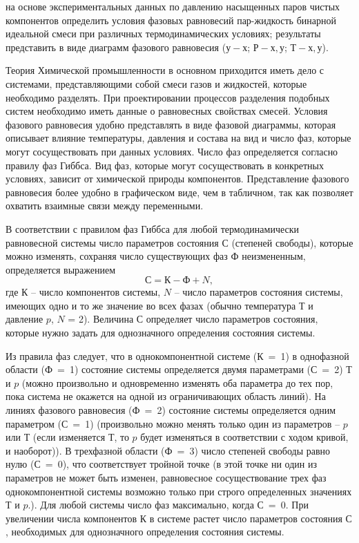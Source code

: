 
\goal на основе экспериментальных данных по давлению насыщенных паров чистых компонентов определить условия фазовых равновесий пар-жидкость бинарной идеальной смеси при различных термодинамических условиях; результаты представить в виде диаграмм фазового равновесия ($у-х$; $Р-х, у$; $Т-х, у$).

Теория
Химической промышленности в основном приходится иметь дело с системами, представляющими собой смеси газов и жидкостей, которые необходимо разделять. При проектировании процессов разделения подобных систем необходимо иметь данные о равновесных свойствах смесей. Условия фазового равновесия удобно представлять в виде фазовой диаграммы, которая описывает влияние температуры, давления и состава на вид и число фаз, которые могут сосуществовать при данных условиях. Число фаз определяется согласно правилу фаз Гиббса. Вид фаз, которые могут сосуществовать в конкретных условиях, зависит от химической природы компонентов. Представление фазового равновесия более удобно в графическом виде, чем в табличном, так как позволяет охватить взаимные связи между переменными.

В соответствии с правилом фаз Гиббса для любой термодинамически равновесной системы число параметров состояния $С$ (степеней свободы), которые можно изменять, сохраняя число существующих фаз $Ф$ неизмененным, определяется выражением
\begin{equation}
С=К-Ф+N,
\end{equation}
где $К$ – число компонентов системы, $N$ – число параметров состояния системы, имеющих одно и то же значение во всех фазах (обычно температура $Т$ и давление $p$, $N$ = 2). Величина $С$ определяет число параметров состояния, которые нужно задать для однозначного определения состояния системы.

Из правила фаз следует, что в однокомпонентной системе ($К$ = 1) в однофазной области ($Ф$ = 1) состояние системы определяется двумя параметрами ($С$ = 2) $Т$ и $p$ (можно произвольно и одновременно изменять оба параметра до тех пор, пока система не окажется на одной из ограничивающих область линий). На линиях фазового равновесия ($Ф$ = 2) состояние системы определяется одним параметром ($С$ = 1) (произвольно можно менять только один из параметров – $p$ или $Т$ (если изменяется $Т$, то $p$ будет изменяться в соответствии с ходом кривой, и наоборот)). В трехфазной области ($Ф$ = 3) число степеней свободы равно нулю ($С$ = 0), что соответствует тройной точке (в этой точке ни один из параметров не может быть изменен, равновесное сосуществование трех фаз однокомпонентной системы возможно только при строго определенных значениях $Т$ и $p$.). Для любой системы число фаз максимально, когда $С$ = 0. При увеличении числа компонентов $К$ в системе растет число параметров состояния $С$, необходимых для однозначного определения состояния системы.

